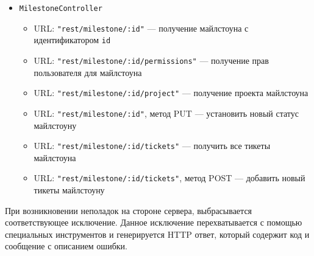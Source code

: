 \begin{itemize}
		\item \texttt{MilestoneController}
		\begin{itemize}
			\item URL: \texttt{"rest/milestone/:id"} --- получение майлстоуна с идентификатором \texttt{id}
			\item URL: \texttt{"rest/milestone/:id/permissions"} --- получение прав пользователя для майлстоуна
			\item URL: \texttt{"rest/milestone/:id/project"} --- получение проекта майлстоуна
			\item URL: \texttt{"rest/milestone/:id"}, метод PUT --- установить новый статус майлстоуну
			\item URL: \texttt{"rest/milestone/:id/tickets"} --- получить все тикеты майлстоуна
			\item URL: \texttt{"rest/milestone/:id/tickets"}, метод POST --- добавить новый тикеты майлстоуну
		\end{itemize}	
	\end{itemize}
	
	При возникновении неполадок на стороне сервера, выбрасывается соответствующее исключение. Данное исключение перехватывается с помощью специальных инструментов и генерируется HTTP ответ, который содержит код и сообщение с описанием ошибки.
	
